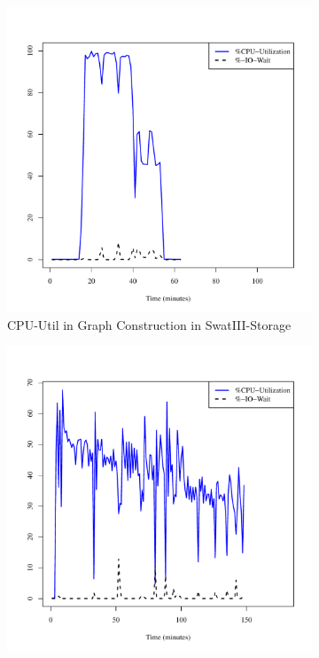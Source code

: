 \documentclass[conference]{IEEEtran}
\begin{document}
\begin{figure}[]
        \begin{subfigure}[b]{0.25\textwidth}
                \includegraphics[width=\textwidth]{Figure/SystemData/Plots/BGCPUSSD.pdf}
                \caption{CPU-Util in Graph Construction in SwatIII-Storage}
                \label{fig:BGCPUSSD}
        \end{subfigure}    
        \begin{subfigure}[b]{0.25\textwidth}
                \includegraphics[width=\textwidth]{Figure/SystemData/Plots/ECCPUSSD.pdf}

\end{subfigure}
\end{figure}
\end{document}
